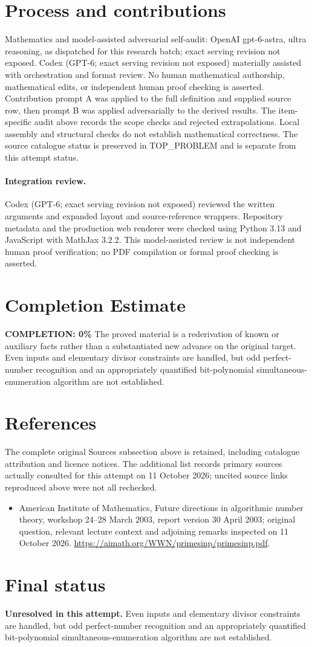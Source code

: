\documentclass[11pt]{article}
\begin{document}
\section{Process and contributions}
Mathematics and model-assisted adversarial self-audit: OpenAI gpt-6-astra, ultra reasoning, as dispatched for this research batch; exact serving revision not exposed. Codex (GPT-6; exact serving revision not exposed) materially assisted with orchestration and format review. No human mathematical authorship, mathematical edits, or independent human proof checking is asserted.
Contribution prompt A was applied to the full definition and supplied source row, then prompt B was applied adversarially to the derived results. The item-specific audit above records the scope checks and rejected extrapolations. Local assembly and structural checks do not establish mathematical correctness. The source catalogue status is preserved in TOP\_PROBLEM and is separate from this attempt status.
\paragraph{Integration review.} Codex (GPT-6; exact serving revision not exposed) reviewed the written arguments and expanded layout and source-reference wrappers. Repository metadata and the production web renderer were checked using Python 3.13 and JavaScript with MathJax 3.2.2. This model-assisted review is not independent human proof verification; no PDF compilation or formal proof checking is asserted.

\section{Completion Estimate}
\noindent\textbf{COMPLETION: 0\%}
The proved material is a rederivation of known or auxiliary facts rather than a substantiated new advance on the original target. Even inputs and elementary divisor constraints are handled, but odd perfect-number recognition and an appropriately quantified bit-polynomial simultaneous-enumeration algorithm are not established.
\section{References}
The complete original Sources subsection above is retained, including catalogue attribution and licence notices. The additional list records primary sources actually consulted for this attempt on 11 October 2026; uncited source links reproduced above were not all rechecked.
\begin{itemize}
\item American Institute of Mathematics, Future directions in algorithmic number theory, workshop 24--28 March 2003, report version 30 April 2003; original question, relevant lecture context and adjoining remarks inspected on 11 October 2026. \url{https://aimath.org/WWN/primesinp/primesinp.pdf}.
\end{itemize}
\section{Final status}
\textbf{Unresolved in this attempt.} Even inputs and elementary divisor constraints are handled, but odd perfect-number recognition and an appropriately quantified bit-polynomial simultaneous-enumeration algorithm are not established.
\end{document}
